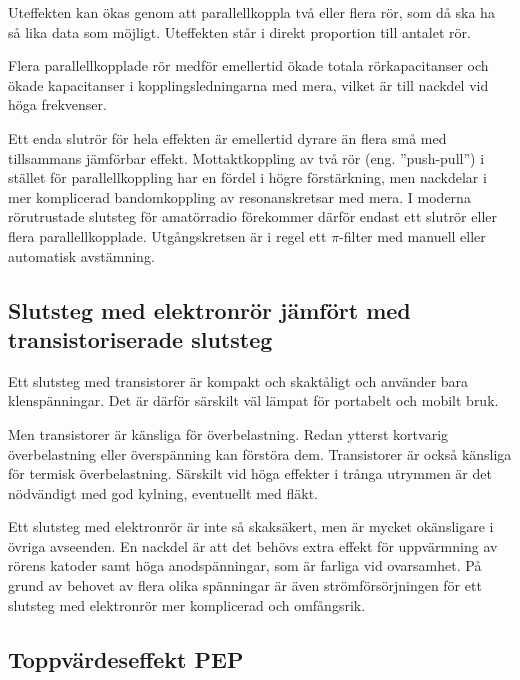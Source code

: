 Uteffekten kan ökas genom att parallellkoppla två eller flera rör, som då ska
ha så lika data som möjligt.
Uteffekten står i direkt proportion till antalet rör.

Flera parallellkopplade rör medför emellertid ökade totala rörkapacitanser och 
ökade kapacitanser i kopplingsledningarna med mera, vilket är till nackdel vid
höga frekvenser.

Ett enda slutrör för hela effekten är emellertid dyrare än flera små med
tillsammans jämförbar effekt.
Mottaktkoppling av två rör (eng. ''push-pull'') i stället för parallellkoppling
har en fördel i högre förstärkning, men nackdelar i mer komplicerad
bandomkoppling av resonanskretsar med mera.
I moderna rörutrustade slutsteg för amatörradio förekommer därför endast ett
slutrör eller flera parallellkopplade.
Utgångskretsen är i regel ett \(\pi \)-filter med manuell eller automatisk
avstämning.

\subsection{Slutsteg med elektronrör jämfört med transistoriserade slutsteg}

Ett slutsteg med transistorer är kompakt och skaktåligt och använder
bara klenspänningar.
Det är därför särskilt väl lämpat för portabelt och mobilt bruk.

Men transistorer är känsliga för överbelastning.
Redan ytterst kortvarig överbelastning eller överspänning kan förstöra dem.
Transistorer är också känsliga för termisk överbelastning.
Särskilt vid höga effekter i trånga utrymmen är det nödvändigt med god kylning,
eventuellt med fläkt.

Ett slutsteg med elektronrör är inte så skaksäkert, men är mycket okänsligare
i övriga avseenden.
En nackdel är att det behövs extra effekt för uppvärmning av rörens katoder
samt höga anodspänningar, som är farliga vid ovarsamhet.
På grund av behovet av flera olika spänningar är även strömförsörjningen för
ett slutsteg med elektronrör mer komplicerad och omfångsrik.

\newpage
\subsection{Toppvärdeseffekt PEP}
\label{PEP-effekt}

